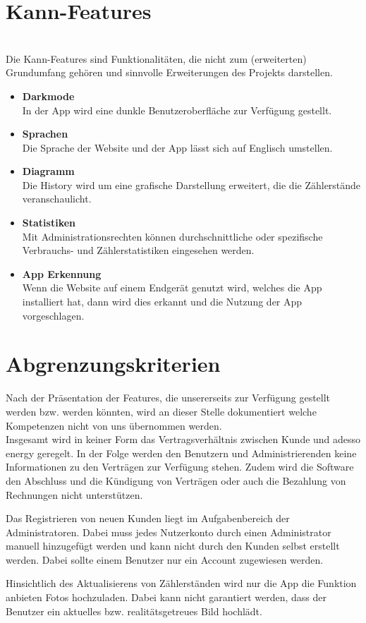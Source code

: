 \section{Kann-Features} \hfill \\
Die Kann-Features sind Funktionalitäten, die nicht zum (erweiterten) Grundumfang gehören und sinnvolle Erweiterungen des Projekts darstellen.
\begin{itemize}
\item  \textbf{Darkmode} \hfill \\
	In der App wird eine dunkle Benutzeroberfläche zur Verfügung gestellt.
\item \textbf{Sprachen} \hfill \\
	Die Sprache der Website und der App lässt sich auf Englisch umstellen.
\item \textbf{Diagramm} \hfill \\
	Die History wird um eine grafische Darstellung erweitert, die die Zählerstände veranschaulicht. 
\item \textbf{Statistiken} \hfill \\
	Mit Administrationsrechten können durchschnittliche oder spezifische Verbrauchs- und Zählerstatistiken eingesehen werden.
\item \textbf{App Erkennung} \hfill \\
	Wenn die Website auf einem Endgerät genutzt wird, welches die App installiert hat, dann wird dies erkannt und
	die Nutzung der App vorgeschlagen.
\end{itemize}

\section{Abgrenzungskriterien}

Nach der Präsentation der Features, die unsererseits zur Verfügung gestellt werden bzw. werden könnten, wird an dieser Stelle dokumentiert welche Kompetenzen nicht von uns übernommen werden. \hfill \\

Insgesamt wird in keiner Form das Vertragsverhältnis zwischen Kunde und adesso energy geregelt. 
In der Folge werden den Benutzern und Administrierenden keine Informationen zu den Verträgen zur Verfügung stehen. Zudem wird die Software den Abschluss und die Kündigung von Verträgen oder auch die Bezahlung von Rechnungen nicht unterstützen. 

Das Registrieren von neuen Kunden liegt im Aufgabenbereich der Administratoren. Dabei muss jedes Nutzerkonto durch einen Administrator manuell hinzugefügt werden und kann nicht durch den Kunden selbst erstellt werden. Dabei sollte einem Benutzer nur ein Account zugewiesen werden.

Hinsichtlich des Aktualisierens von Zählerständen wird nur die App die Funktion anbieten Fotos hochzuladen. Dabei kann nicht garantiert werden, dass der Benutzer ein aktuelles bzw. realitätsgetreues Bild hochlädt.


